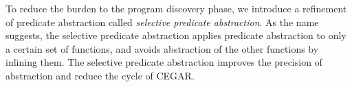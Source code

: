 \begin{enumerate}
      To reduce the burden to the program discovery phase, we introduce
      a refinement of predicate abstraction called \emph{selective
      predicate abstraction}.  As the name suggests, the selective
      predicate abstraction applies predicate abstraction to only a
      certain set of functions, and avoids abstraction of the other
      functions by inlining them.
      The selective
      predicate abstraction improves the precision of abstraction and
      reduce the cycle of CEGAR.


\end{enumerate}
